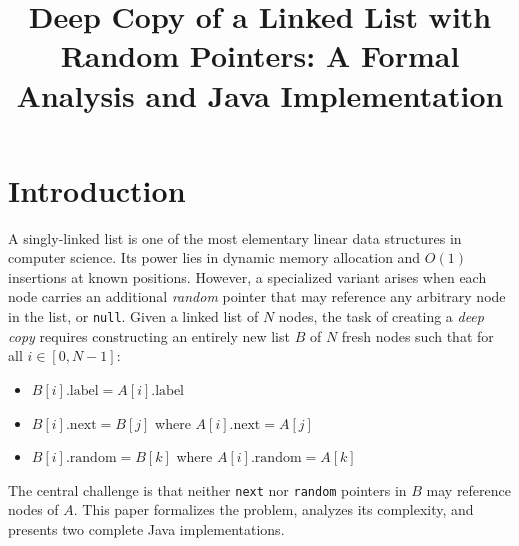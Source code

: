 \documentclass[10pt,journal,compsoc]{IEEEtran}
\begin{document}
\title{Deep Copy of a Linked List with Random Pointers: A Formal Analysis and Java Implementation}


\maketitle
\IEEEdisplaynontitleabstractindextext
\IEEEpeerreviewmaketitle

\section{Introduction}
A singly-linked list is one of the most elementary linear data structures in computer science. Its power lies in dynamic memory allocation and $O(1)$ insertions at known positions. However, a specialized variant arises when each node carries an additional \textit{random} pointer that may reference any arbitrary node in the list, or \texttt{null}. Given a linked list of $N$ nodes, the task of creating a \textit{deep copy} requires constructing an entirely new list $B$ of $N$ fresh nodes such that for all $i \in [0, N-1]$:
\begin{itemize}
    \item $B[i].\text{label} = A[i].\text{label}$
    \item $B[i].\text{next} = B[j]$ where $A[i].\text{next} = A[j]$
    \item $B[i].\text{random} = B[k]$ where $A[i].\text{random} = A[k]$
\end{itemize}

The central challenge is that neither \texttt{next} nor \texttt{random} pointers in $B$ may reference nodes of $A$. This paper formalizes the problem, analyzes its complexity, and presents two complete Java implementations.
\end{document}
